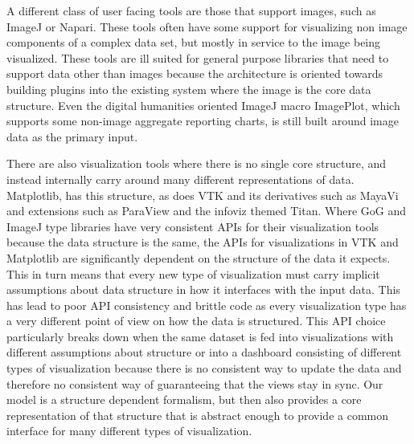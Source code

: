 \documentclass[../main.tex]{subfiles}
\begin{document}
A different class of user facing tools are those that support images, such as ImageJ\cite{schneiderNIHImageImageJ2012} or Napari\cite{nicholas_sofroniew_2021_4533308}. These tools often have some support for visualizing non image components of a complex data set, but mostly in service to the image being visualized. These tools are ill suited for general purpose libraries that need to support data other than images because the architecture is oriented towards building plugins into the existing system \cite{WritingPlugins} where the image is the core data structure. Even the digital humanities oriented ImageJ macro ImagePlot\cite{studiesCulturevisImageplot2021}, which supports some non-image aggregate reporting charts, is still built around image data as the primary input. 

There are also visualization tools where there is no single core structure, and instead internally carry around many different representations of data. Matplotlib, has this structure, as does VTK \cite{hanwellVisualizationToolkitVTK2015,geveci2012vtk} and its derivatives such as MayaVi\cite{RamachandranMayaVI2011} and extensions such as ParaView\cite{ahrens2005paraview} and the infoviz themed Titan\cite{brianwylieUnifiedToolkitInformation2009}. Where GoG and ImageJ type libraries have very consistent APIs for their visualization tools because the data structure is the same, the APIs for visualizations in VTK and Matplotlib are significantly dependent on the structure of the data it expects. This in turn means that every new type of visualization must carry implicit assumptions about data structure in how it interfaces with the input data. This has lead to poor API consistency and brittle code as every visualization type has a very different point of view on how the data is structured. This API choice particularly breaks down when the same dataset is fed into visualizations with different assumptions about structure or into a dashboard consisting of different types of visualization\cite{a.sarikayaWhatWeTalk2019,fewDashboardConfusionRevisited2007} because there is no consistent way to update the data and therefore no consistent way of guaranteeing that the views stay in sync. Our model is a structure dependent formalism, but then also provides a core representation of that structure that is abstract enough to provide a common interface for many different types of visualization.
\end{document}
